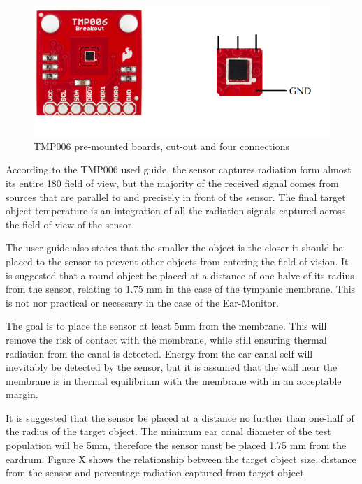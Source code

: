 \begin{figure}[h]
   \centering
   \includegraphics[scale=0.8]{figs/TMP006_Breakout}
   \caption{TMP006 pre-mounted boards, cut-out and four connections}
   \label{fig:TMP006_Breakout}
\end{figure}

According to the TMP006 used guide, the sensor captures radiation form almost its entire 180\textdegree{} field of view, but the majority of the received signal comes from sources that are parallel to and precisely in front of the sensor. The final target object temperature is an integration of all the radiation signals captured across the field of view of the sensor.

\medskip

The user guide also states that the smaller the object is the closer it should be placed to the sensor to prevent other objects from entering the field of vision. It is suggested that a round object be placed at a distance of one halve of its radius from the sensor, relating to 1.75 mm in the case of the tympanic membrane. This is not nor practical or necessary in the case of the Ear-Monitor.  

\medskip

The goal is to place the sensor at least 5mm from the membrane. This will remove the risk of contact with the membrane, while still ensuring thermal radiation from the canal is detected. Energy from the ear canal self will inevitably be detected by the sensor, but it is assumed that the wall near the membrane is in thermal equilibrium with the membrane with in an acceptable margin.

\medskip

It is suggested that the sensor be placed at a distance no further than one-half of the radius of the target object. The minimum ear canal diameter of the test population will be 5mm, therefore the sensor must be placed 1.75 mm from the eardrum. Figure X shows the relationship between the target object size, distance from the sensor and percentage radiation captured from target object.


